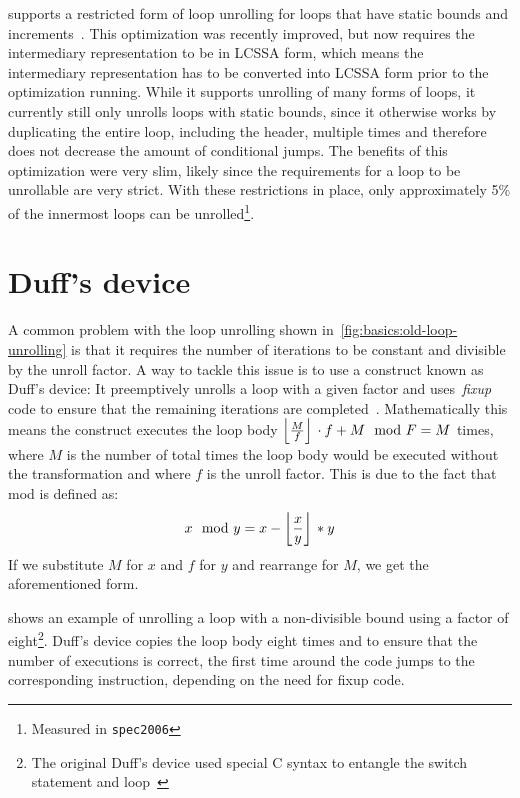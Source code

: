 \libFIRM{} supports a restricted form of loop unrolling for loops that have static bounds and increments~\cite{helmer10studienarbeit}.
This optimization was recently improved, but now requires the intermediary representation to be in LCSSA form, which means the~\libFIRM{} intermediary representation has to be converted into LCSSA form prior to the optimization running\cite{aebi18bachelorarbeit}.
While it supports unrolling of many forms of loops, it currently still only unrolls loops with static bounds, since it otherwise works by duplicating the entire loop, including the header, multiple times and therefore does not decrease the amount of conditional jumps.
The benefits of this optimization were very slim, likely since the requirements for a loop to be unrollable are very strict.
With these restrictions in place, only approximately 5\% of the innermost loops can be unrolled\footnote{Measured in \texttt{spec2006}}.




\section{Duff's device}\label{sec:basics:duffs}

A common problem with the loop unrolling shown in~\cref{fig:basics:old-loop-unrolling} is that it requires the number of iterations to be constant and divisible by the unroll factor.
A way to tackle this issue is to use a construct known as Duff's device: It preemptively unrolls a loop with a given factor and uses~\textit{fixup} code to ensure that the remaining iterations are completed~\cite{duff_1983}.
Mathematically this means the construct executes the loop body $\left\lfloor{}\frac{M}{f}\right\rfloor{} \cdot f + M \mod F = M$ times, where $M$ is the number of total times the loop body would be executed without the transformation and where $f$ is the unroll factor.
This is due to the fact that mod is defined as:
$$x \mod{} y = x - \left\lfloor{}\frac{x}{y}\right\rfloor{} * y$$
If we substitute $M$ for $x$ and $f$ for $y$ and rearrange for $M$, we get the aforementioned form.

 shows an example of unrolling a loop with a non-divisible bound using a factor of eight\footnote{The original Duff's device used special C syntax to entangle the switch statement and loop~\cite{duff_1983}}.
Duff's device copies the loop body eight times and to ensure that the number of executions is correct, the first time around the code jumps to the corresponding instruction, depending on the need for fixup code.

